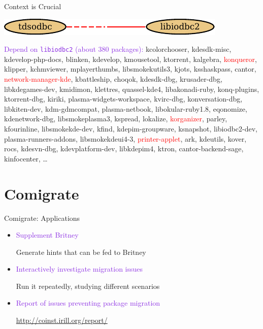 \documentclass[xcolor={dvipsnames}]{beamer}
\newcommand{\ZZZ}[1]{\textcolor{red}{#1}}
\newcommand{\EEE}[1]{\textcolor{BlueViolet}{#1}}
\begin{document}
\begin{frame}{Context is Crucial}
\begin{center}
\includegraphics{libiodbc2}
\end{center}
\EEE{Depend on \texttt{libiodbc2} (about 380 packages):}
kcolorchooser, kdesdk-misc, kdevelop-php-docs, blinken, kdevelop,
kmousetool, ktorrent, kalgebra, \ZZZ{konqueror}, klipper, kchmviewer,
mplayerthumbs, libsmokekutils3, kjots, ksshaskpass, cantor,
\ZZZ{network-manager-kde}, kbattleship, choqok, kdesdk-dbg, krusader-dbg,
libkdegames-dev, kmidimon, klettres, quassel-kde4, libakonadi-ruby,
konq-plugins, ktorrent-dbg, kiriki, plasma-widgets-workspace, kvirc-dbg,
konversation-dbg, libkiten-dev, kdm-gdmcompat, plasma-netbook,
libokular-ruby1.8, eqonomize, kdenetwork-dbg, libsmokeplasma3, kspread,
lokalize, \ZZZ{korganizer}, parley, kfourinline, libsmokekde-dev, kfind,
kdepim-groupware, ksnapshot, libiodbc2-dev, plasma-runners-addons,
libsmokekdeui4-3, \ZZZ{printer-applet}, ark, kdeutils, kover, rocs, kdesvn-dbg,
kdevplatform-dev, libkdepim4, ktron, cantor-backend-sage, kinfocenter,
\ldots

\end{frame}

\part{Comigrate}
\frame{\partpage}

\begin{frame}{Comigrate: Applications}

\begin{itemize}
\item \EEE{Supplement Britney}

Generate hints that can be fed to Britney

\vspace{0.5em}

\item \EEE{Interactively investigate migration issues}

Run it repeatedly, studying different scenarios

\vspace{0.5em}

\item \EEE{Report of issues preventing package migration}

\url{http://coinst.irill.org/report/}

\end{itemize}
\end{frame}
\end{document}
